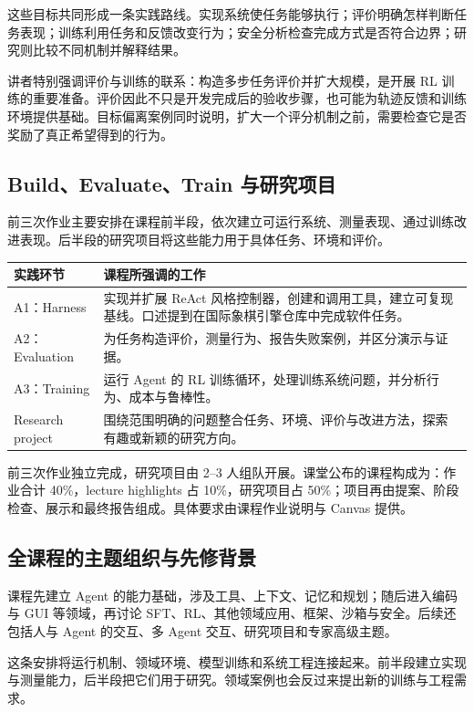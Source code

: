 \documentclass[11pt,a4paper]{article}
\begin{document}
这些目标共同形成一条实践路线。实现系统使任务能够执行；评价明确怎样判断任务表现；训练利用任务和反馈改变行为；安全分析检查完成方式是否符合边界；研究则比较不同机制并解释结果。

讲者特别强调评价与训练的联系：构造多步任务评价并扩大规模，是开展 RL 训练的重要准备。评价因此不只是开发完成后的验收步骤，也可能为轨迹反馈和训练环境提供基础。目标偏离案例同时说明，扩大一个评分机制之前，需要检查它是否奖励了真正希望得到的行为。

\subsection{Build、Evaluate、Train 与研究项目}
前三次作业主要安排在课程前半段，依次建立可运行系统、测量表现、通过训练改进表现。后半段的研究项目将这些能力用于具体任务、环境和评价。

\begin{center}\small\renewcommand{\arraystretch}{1.35}
\begin{tabularx}{\textwidth}{p{3.3cm} X}
\toprule
实践环节 & 课程所强调的工作\\
\midrule
A1：Harness & 实现并扩展 ReAct 风格控制器，创建和调用工具，建立可复现基线。口述提到在国际象棋引擎仓库中完成软件任务。\\
A2：Evaluation & 为任务构造评价，测量行为、报告失败案例，并区分演示与证据。\\
A3：Training & 运行 Agent 的 RL 训练循环，处理训练系统问题，并分析行为、成本与鲁棒性。\\
Research project & 围绕范围明确的问题整合任务、环境、评价与改进方法，探索有趣或新颖的研究方向。\\
\bottomrule
\end{tabularx}\end{center}

前三次作业独立完成，研究项目由 2--3 人组队开展。课堂公布的课程构成为：作业合计 40\%，lecture highlights 占 10\%，研究项目占 50\%；项目再由提案、阶段检查、展示和最终报告组成。具体要求由课程作业说明与 Canvas 提供。

\subsection{全课程的主题组织与先修背景}
课程先建立 Agent 的能力基础，涉及工具、上下文、记忆和规划；随后进入编码与 GUI 等领域，再讨论 SFT、RL、其他领域应用、框架、沙箱与安全。后续还包括人与 Agent 的交互、多 Agent 交互、研究项目和专家高级主题。

这条安排将运行机制、领域环境、模型训练和系统工程连接起来。前半段建立实现与测量能力，后半段把它们用于研究。领域案例也会反过来提出新的训练与工程需求。
\end{document}
